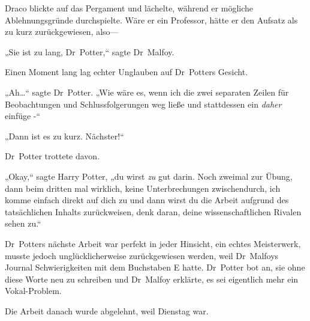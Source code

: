 Draco blickte auf das Pergament und lächelte, während er mögliche Ablehnungsgründe durchspielte. Wäre er ein Professor, hätte er den Aufsatz als zu kurz zurückgewiesen, also—

„Sie ist zu lang, Dr~Potter,“ sagte Dr~Malfoy.

Einen Moment lang lag echter Unglauben auf Dr~Potters Gesicht.

„Ah…“ sagte Dr~Potter. „Wie wäre es, wenn ich die zwei separaten Zeilen für Beobachtungen und Schlussfolgerungen weg ließe und stattdessen ein \emph{daher} einfüge -“

„Dann ist es zu kurz. Nächster!“

Dr~Potter trottete davon.

„Okay,“ sagte Harry Potter, „du wirst \emph{zu} gut darin. Noch zweimal zur Übung, dann beim dritten mal wirklich, keine Unterbrechungen zwischendurch, ich komme einfach direkt auf dich zu und dann wirst du die Arbeit aufgrund des tatsächlichen Inhalts zurückweisen, denk daran, deine wissenschaftlichen Rivalen sehen zu.“

Dr~Potters nächste Arbeit war perfekt in jeder Hinsicht, ein echtes Meisterwerk, musste jedoch unglücklicherweise zurückgewiesen werden, weil Dr~Malfoys Journal Schwierigkeiten mit dem Buchstaben E hatte. Dr~Potter bot an, sie ohne diese Worte neu zu schreiben und Dr~Malfoy erklärte, es sei eigentlich mehr ein Vokal-Problem.

Die Arbeit danach wurde abgelehnt, weil Dienstag war.

